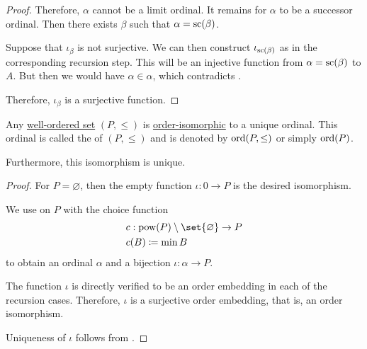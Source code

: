 \begin{proof}
  Therefore, \( \alpha \) cannot be a limit ordinal. It remains for \( \alpha \) to be a successor ordinal. Then there exists \( \beta \) such that \( \alpha = \op{sc}(\beta) \).

  Suppose that \( \iota_\beta \) is not surjective. We can then construct \( \iota_{\op{sc}(\beta)} \) as in the corresponding recursion step. This will be an injective function from \( \alpha = \op{sc}(\beta) \) to \( A \). But then we would have \( \alpha \in \alpha \), which contradicts .

  Therefore, \( \iota_\beta \) is a surjective function.
\end{proof}

\begin{theorem}\label{thm:well_ordered_order_type_existence}
  Any \hyperref[def:well_ordered_set]{well-ordered set} \( (P, \leq) \) is \hyperref[def:preordered_set/homomorphism]{order-isomorphic} to a unique ordinal. This ordinal is called the  of \( (P, \leq) \) and is denoted by \( \operatorname{ord}(P, \leq) \) or simply \( \operatorname{ord}(P) \).

  Furthermore, this isomorphism is unique.
\end{theorem}
\begin{proof}
  For \( P = \varnothing \), then the empty function \( \iota: 0 \to P \) is the desired isomorphism.

  We use  on \( P \) with the choice function
  \begin{equation*}
    \begin{aligned}
      &c: \pow(P) \setminus \set{ \varnothing } \to P \\
      &c(B) \coloneqq \min B
    \end{aligned}
  \end{equation*}
  to obtain an ordinal \( \alpha \) and a bijection \( \iota: \alpha \to P \).

  The function \( \iota \) is directly verified to be an order embedding in each of the recursion cases. Therefore, \( \iota \) is a surjective order embedding, that is, an order isomorphism.

  Uniqueness of \( \iota \) follows from .
\end{proof}

